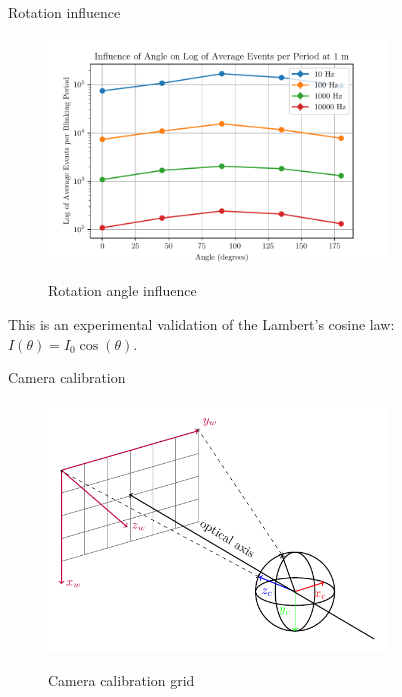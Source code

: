 \documentclass{beamer}
\begin{document}
\begin{frame}{Rotation influence}

\begin{figure}[H]
    \centering
    \includegraphics[width=0.8\textwidth]{../fig/semestral/angle2.pdf}
    \label{fig:rotation_influence}
    \caption{Rotation angle influence}
\end{figure}

\scriptsize{
    This is an experimental validation of the Lambert's cosine law: $I(\theta) = I_0\cos(\theta)$.
}

\end{frame}

\begin{frame}{Camera calibration}
   
   \begin{figure}[H]
        \centering
        \includegraphics[width=0.8\textwidth]{../fig/tikz/extrinsic.pdf}
        \label{fig:calib1}
        \caption{Camera calibration grid}
    \end{figure}
    
\end{frame}
\end{document}
